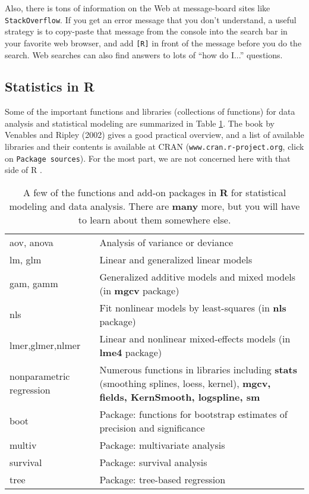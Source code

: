 \documentclass [11pt]{article}
\newcommand{\ttt}[1]{\texttt{#1}}
\numberwithin{exercise}{section}
\def\R{R }
\begin{document}
Also, there is tons of information on the Web at message-board sites like  
\texttt{StackOverflow}. If you get an error message that you don't
understand, a useful strategy is to copy-paste that message from the console into the
search bar in your favorite web browser, and add \texttt{[R]} in front of the message 
before you do the search. Web searches can also find answers to lots of ``how do I...'' questions. 

\subsection*{Statistics in \R}
Some of the important functions and libraries (collections of functions) for data analysis
and statistical modeling are summarized in Table 
\ref{StatModelingFunctions}. The book by Venables and Ripley (2002) gives a good practical overview, and a 
list of available libraries and their contents is available at CRAN 
(\ttt{www.cran.r-project.org}, click on \ttt{Package sources}). For the most part, we are 
not concerned here with that side of \R. 

\begin{table}[t!]
\begin{tabular}{p{140pt}p{290pt}}
\hline
aov, anova & Analysis of variance or deviance\\
lm, glm &  Linear and generalized linear models\\
gam, gamm & Generalized additive models and mixed models (in \textbf{mgcv} package) \\
nls & Fit nonlinear models by least-squares (in \textbf{nls} package)\\
lmer,glmer,nlmer & Linear and nonlinear mixed-effects models (in \textbf{lme4} package) \\
nonparametric regression & Numerous functions in libraries including
\textbf{stats} (smoothing splines, loess, kernel), \textbf{mgcv, fields, KernSmooth, logspline, sm} \\
boot & Package: functions for bootstrap estimates of precision and significance \\
multiv & Package: multivariate analysis \\
survival & Package: survival analysis \\
tree & Package: tree-based regression \\
\hline 
\end{tabular}
\caption{\small{A few of the functions and add-on packages in {\bf R} for statistical
modeling and data analysis. There are \textbf{many} more, but you will have
to learn about them somewhere else.}} 
\label{StatModelingFunctions}
\end{table}
\end{document}

